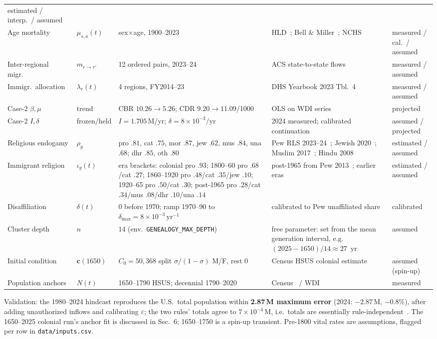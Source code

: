 \documentclass[11pt,a4paper]{article}
\begin{document}
{\begin{longtable}{@{}lllp{3.6cm}p{2.9cm}@{}}
  estimated / interp.\ / assumed \\
Age mortality & $\mu_{s,a}(t)$ & sex$\times$age, 1900--2023 &
  HLD~\cite{hld}; Bell \& Miller~\cite{bell-miller};
  NCHS~\cite{nchs-lifetables} & measured / cal.\ / assumed \\
Inter-regional migr.\ & $m_{r\to r'}$ & 12 ordered pairs, 2023--24 &
  ACS state-to-state flows~\cite{acs-migration} & measured / assumed \\
Immigr.\ allocation & $\lambda_r(t)$ & 4 regions, FY2014--23 &
  DHS Yearbook 2023 Tbl.~4~\cite{dhs-table4} & measured / assumed \\
Case-2 $\beta,\mu$ & trend & CBR $10.26{\to}5.26$; CDR $9.20{\to}11.09$/1000 &
  OLS on WDI series~\cite{wdi} & projected \\
Case-2 $I,\delta$ & frozen/held & $I{=}1.705$\,M/yr; $\delta{=}8{\times}10^{-3}$/yr &
  2024 measured; calibrated continuation & assumed / projected \\
Religious endogamy & $\rho_g$ &
  pro $.81$, cat $.75$, mor $.87$, jew $.62$, mus $.84$, una $.68$;
  dhr $.85$, oth $.80$ &
  Pew RLS 2023--24~\cite{pew-intermarriage-2025};
  Jewish 2020~\cite{pew-jewish-2021}; Muslim 2017~\cite{pew-muslim-2017};
  Hindu 2008~\cite{pew-rls-2008} & estimated / assumed \\
Immigrant religion & $\iota_g(t)$ &
  era brackets: colonial pro $.93$; 1800--60 pro $.68$/cat $.27$;
  1860--1920 pro $.48$/cat $.35$/jew $.10$; 1920--65 pro $.50$/cat $.30$;
  post-1965 pro $.28$/cat $.34$/mus $.08$/dhr $.10$/una $.14$ &
  post-1965 from Pew 2013~\cite{pew-immig-2013}; earlier eras &
  estimated / assumed \\
Disaffiliation & $\delta(t)$ &
  $0$ before 1970; ramp 1970--90 to
  $\delta_{\max}=8\times10^{-3}\,\mathrm{yr}^{-1}$ &
  calibrated to Pew unaffiliated share~\cite{pew-rls-2025} & calibrated \\
Cluster depth & $n$ & $14$ (env.\ \texttt{GENEALOGY\_MAX\_DEPTH}) &
  free parameter: set from the mean generation interval, e.g.\
  $(2025-1650)/14\approx 27$~yr & assumed \\
Initial condition & $\mathbf{c}(1650)$ & $C_0{=}50{,}368$ split
  $\sigma/(1{-}\sigma)$ M/F, rest $0$ &
  Census HSUS colonial estimate~\cite{census-hsus} & assumed (spin-up) \\
Population anchors & $N(t)$ & 1650--1790 HSUS; decennial 1790--2020 &
  Census~\cite{census-decennial} / WDI~\cite{wdi} & measured \\
\end{longtable}
}
Validation: the 1980--2024 hindcast reproduces the U.S.\ total population
within \textbf{2.87\,M maximum error} (2024: $-2.87$\,M, $-0.8\%$), after
adding unauthorized inflows and calibrating $\varepsilon$; the two rules'
totals agree to $7\times10^{-4}$\,M, i.e.\ totals are essentially
rule-independent~\cite{census-decennial,wdi,inputs-csv}.  The 1650--2025
colonial run's anchor fit is discussed in Sec.~6; 1650--1750
is a spin-up transient.  Pre-1800 vital rates are assumptions, flagged per row
in \texttt{data/inputs.csv}.
\end{document}
